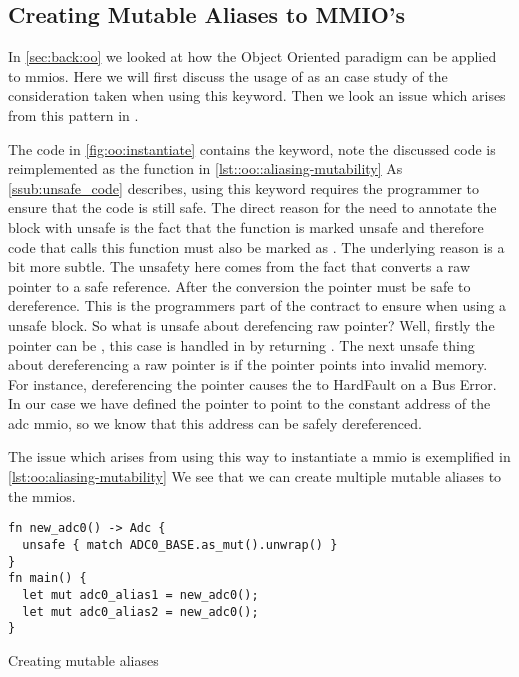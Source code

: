 \subsection{Creating Mutable Aliases to MMIO's}
\label{sec:res:aliasing-mmios}

In \autoref{sec:back:oo} we looked at how the Object Oriented paradigm can be applied to \glspl{mmio}.
Here we will first discuss the usage of {\unsafe} as an case study of the consideration taken when using this keyword.
Then we look an issue which arises from this pattern in {\rust}.

The {\rust} code in \autoref{fig:oo:instantiate} contains the {\unsafe} keyword, note the discussed code is reimplemented as the  function in \autoref{lst::oo::aliasing-mutability}
As \autoref{ssub:unsafe_code} describes, using this keyword requires the programmer to ensure that the code is still safe.
The direct reason for the need to annotate the block with unsafe is the fact that the function  is marked unsafe and therefore code that calls this function must also be marked as .
The underlying reason is a bit more subtle.
The unsafety here comes from the fact that  converts a raw pointer to a safe reference.
After the conversion the pointer must be safe to dereference.
This is the programmers part of the contract to ensure when using a unsafe block.
So what is unsafe about derefencing raw pointer?
Well, firstly the pointer can be , this case is handled in  by returning .
The next unsafe thing about dereferencing a raw pointer is if the pointer points into invalid memory.
For instance, dereferencing the pointer   causes the {\gecko} to HardFault on a Bus Error.
In our case we have defined the pointer to point to the constant address of the \gls{adc} \gls{mmio}, so we know that this address can be safely dereferenced.

The issue which arises from using this way to instantiate a \gls{mmio} is exemplified in \autoref{lst:oo:aliasing-mutability}
We see that we can create multiple mutable aliases to the \glspl{mmio}.

\begin{listing}[H]
  \begin{verbatim}
fn new_adc0() -> Adc {
  unsafe { match ADC0_BASE.as_mut().unwrap() }
}
fn main() {
  let mut adc0_alias1 = new_adc0();
  let mut adc0_alias2 = new_adc0();
}
  \end{verbatim}
  \caption{Creating mutable aliases}
  \label{lst:oo:aliasing-mutability}
\end{listing}

